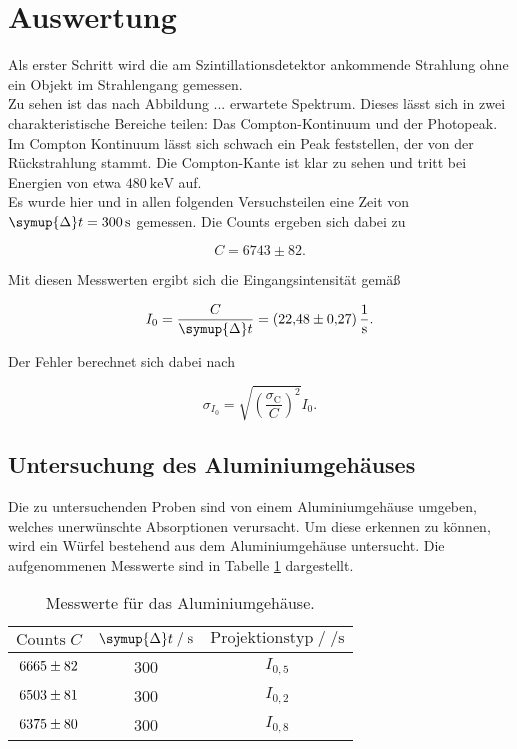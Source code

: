 \section{Auswertung}
\label{sec:Auswertung}

Als erster Schritt wird die am Szintillationsdetektor ankommende Strahlung ohne ein Objekt im Strahlengang gemessen. \\
Zu sehen ist das nach Abbildung ... erwartete Spektrum. Dieses lässt sich in zwei charakteristische Bereiche teilen: Das 
Compton-Kontinuum und der Photopeak. Im Compton Kontinuum lässt sich schwach ein Peak feststellen, der von der Rückstrahlung 
stammt. Die Compton-Kante ist klar zu sehen und tritt bei Energien von etwa $\SI{480}{\kilo\electronvolt}$ auf.\\
Es wurde hier und in allen folgenden Versuchsteilen eine Zeit von $\symup{\Delta}t = \SI{300}{\second}$ gemessen. Die Counts 
ergeben sich dabei zu

\begin{equation*}
  C = 6743 \pm 82.
\end{equation*}

Mit diesen Messwerten ergibt sich die Eingangsintensität gemäß 

\begin{equation}
  I_0 = \frac{C}{\symup{\Delta}t} = \SI{22.48+-0.27}{\per\second}.
  \label{eqn:Int}
\end{equation}

Der Fehler berechnet sich dabei nach

\begin{equation*}
  \sigma_{I_0} = \sqrt{\left(\frac{\sigma_\text{C}}{C}\right)^2}I_0.
\end{equation*}

\subsection{Untersuchung des Aluminiumgehäuses}

Die zu untersuchenden Proben sind von einem Aluminiumgehäuse umgeben, welches unerwünschte Absorptionen verursacht. Um diese
erkennen zu können, wird ein Würfel bestehend aus dem Aluminiumgehäuse untersucht. Die aufgenommenen Messwerte sind in 
Tabelle \ref{tab:mess1} dargestellt. 

\begin{table}[H]
  \centering
  \caption{Messwerte für das Aluminiumgehäuse.}
  \label{tab:mess1}
  \begin{tabular}{c c c}
  \toprule
  $\text{Counts} \; C$ & $\symup{\Delta} t \;/\; \si{\second}$ & $\text{Projektionstyp} \;/\; \si{\per\second}$ \\
  \midrule
      $\num{6665+-82}$ & 300 & $I_{0,5}$\\
      $\num{6503+-81}$ & 300 & $I_{0,2}$\\
      $\num{6375+-80}$ & 300 & $I_{0,8}$\\
  \bottomrule
  \end{tabular}
\end{table}

